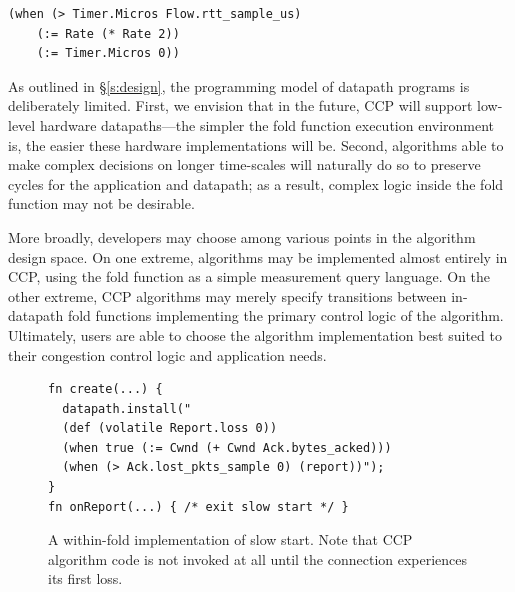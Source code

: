 {\footnotesize
\begin{verbatim}
(when (> Timer.Micros Flow.rtt_sample_us)
    (:= Rate (* Rate 2))
    (:= Timer.Micros 0))
\end{verbatim}
}

 As outlined in \S\ref{s:design}, the programming model of datapath programs is deliberately limited.
First, we envision that in the future, CCP will support low-level hardware datapaths---the simpler the fold function execution environment is, the easier these hardware implementations will be. Second, algorithms able to make complex decisions on longer time-scales will naturally do so to preserve cycles for the application and datapath; as a result, complex logic inside the fold function may not be desirable.

More broadly, developers may choose among various points in the algorithm design space. 
On one extreme, algorithms may be implemented almost entirely in CCP, using the fold function as a simple measurement query language.
On the other extreme, CCP algorithms may merely specify transitions between in-datapath fold functions implementing the primary control logic of the algorithm.
Ultimately, users are able to choose the algorithm implementation best suited to their congestion control logic and application needs.

\begin{figure}[h]
{\footnotesize
\begin{verbatim}
fn create(...) {
  datapath.install("
  (def (volatile Report.loss 0))
  (when true (:= Cwnd (+ Cwnd Ack.bytes_acked)))
  (when (> Ack.lost_pkts_sample 0) (report))");
}
fn onReport(...) { /* exit slow start */ }
\end{verbatim}
}
\caption{A within-fold implementation of slow start. Note that CCP algorithm code is not invoked at all until the connection experiences its first loss.} \label{lst:ccp:ssfold}
\end{figure}
